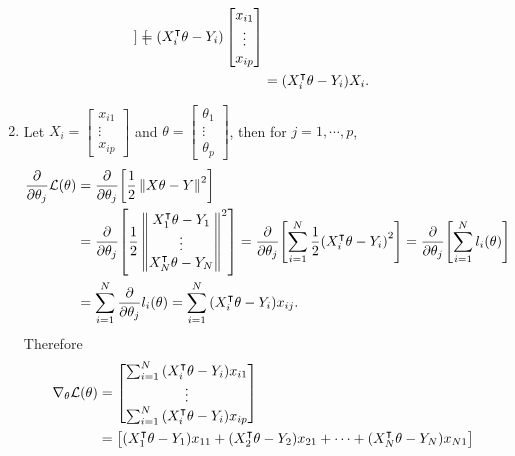 \documentclass[10pt]{article}
\begin{document}
\begin{enumerate}[leftmargin=*, label={(\alph*)}]
\begin{align*}
\begin{bmatrix}
        \end{bmatrix} = \qty(X_i^\intercal \theta - Y_i)\begin{bmatrix}
            x_{i1} \\ \vdots \\ x_{ip}
        \end{bmatrix} \\
        &= \qty(X_i^\intercal \theta - Y_i)X_i.
    \end{align*}
    \item Let $X_i = \begin{bmatrix}
        x_{i1} \\ \vdots \\ x_{ip}
    \end{bmatrix}$ and $\theta = \begin{bmatrix}
        \theta_1 \\ \vdots \\ \theta_p
    \end{bmatrix}$, then for $j = 1, \cdots, p$,
    \begin{align*}
        \frac{\partial}{\partial\theta_j}\mathcal{L}(\theta) &= \frac{\partial}{\partial\theta_j}\qty[\frac{1}{2}\left\Vert X\theta - Y \right\Vert^2] \\
        &= \frac{\partial}{\partial\theta_j}\qty[\frac{1}{2}\begin{Vmatrix}
            X_1^\intercal \theta - Y_1 \\ \vdots \\ X_N^\intercal \theta - Y_N
        \end{Vmatrix}^2] = \frac{\partial}{\partial\theta_j}\qty[\sum_{i=1}^{N}\frac{1}{2}\qty(X_i^\intercal \theta - Y_i)^2] = \frac{\partial}{\partial\theta_j}\qty[\sum_{i=1}^{N}l_i(\theta)] \\
        &= \sum_{i=1}^{N}\frac{\partial}{\partial\theta_j}l_i(\theta) = \sum_{i=1}^{N}\qty(X_i^\intercal \theta - Y_i)x_{ij}.
    \end{align*}
    Therefore
    \begin{align*}
        \nabla_\theta\mathcal{L}(\theta) &= \begin{bmatrix}
            \sum_{i=1}^{N}\qty(X_i^\intercal \theta - Y_i)x_{i1} \\ \vdots \\ \sum_{i=1}^{N}\qty(X_i^\intercal \theta - Y_i)x_{ip}
        \end{bmatrix} \\ 
        &= \begin{bmatrix}
            \qty(X_1^\intercal \theta - Y_1)x_{11} + \qty(X_2^\intercal \theta - Y_2)x_{21} + \cdots + \qty(X_N^\intercal \theta - Y_N)x_{N1} \\

\end{bmatrix}
\end{align*}
\end{enumerate}
\end{document}
